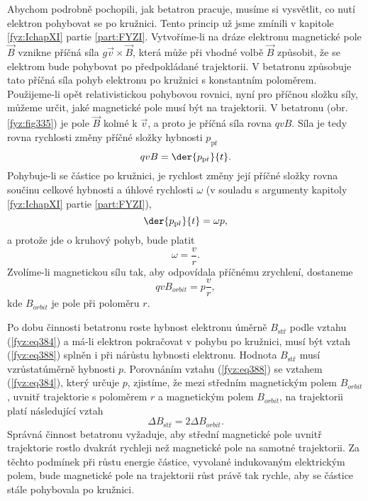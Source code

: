   Abychom podrobně pochopili, jak betatron pracuje, musíme si vysvětlit, co nutí elektron 
  pohybovat se po kružnici. Tento princip už jsme zmínili v kapitole \ref{fyz:IchapXI} partie 
  \ref{part:FYZI}. Vytvoříme-li na dráze elektronu magnetické pole \(\vec{B}\) vznikne příčná síla 
  \(g\vec{v}\times\vec{B}\), která může při vhodné volbě \(\vec{B}\) způsobit, že se elektrom bude 
  pohybovat po předpokládané trajektorii. V betatronu způsobuje tato příčná síla pohyb elektronu 
  po kružnici s konstantním poloměrem. Použijeme-li opět relativistickou pohybovou rovnici, nyní 
  pro příčnou složku síly, můžeme určit, jaké magnetické pole musí být na trajektorii. V betatronu 
  (obr. \ref{fyz:fig335}) je pole \(\vec{B}\) kolmé k \(\vec{v}\), a proto je příčná síla 
  rovna \(qvB\). Síla je tedy rovna rychlosti změny příčné složky hybnosti \(p_\text{př}\)
  \begin{equation}\label{fyz:eq385}
    qvB = \der{p_{\text{př}}}{t}.
  \end{equation}
  Pohybuje-li se částice po kružnici, je rychlost změny její příčné složky rovna součinu celkové 
  hybnosti a úhlové rychlosti \(\omega\) (v souladu s argumenty kapitoly \ref{fyz:IchapXI} partie 
  \ref{part:FYZI}),
  \begin{equation}\label{fyz:eq386}
    \der{p_{\text{př}}}{t} = \omega p, 
  \end{equation}
  a protože jde o kruhový pohyb, bude platit
  \begin{equation}\label{fyz:eq387}
    \omega = \frac{v}{r}. 
  \end{equation}
  Zvolíme-li magnetickou sílu tak, aby odpovídala příčnému zrychlení, dostaneme
  \begin{equation}\label{fyz:eq388}
    qvB_{orbit} = p\frac{v}{r},
  \end{equation}
  kde \(B_{orbit}\) je pole při poloměru \(r\). 
  
  Po dobu činnosti betatronu roste hybnost elektronu úměrně \(B_{\text{stř}}\) podle vztahu 
  (\ref{fyz:eq384}) a má-li elektron pokračovat v pohybu po kružnici, musí být vztah 
  (\ref{fyz:eq388}) splněn i při nárůstu hybnosti elektronu. Hodnota \(B_{\text{stř}}\) musí 
  vzrůstatúměrně hybnosti \(p\). Porovnáním vztahu (\ref{fyz:eq388}) se vztahem (\ref{fyz:eq384}), 
  který určuje \(p\), zjistíme, že mezi středním magnetickým polem \(B_{orbit}\), uvnitř 
  trajektorie s poloměrem \(r\) a magnetickým polem \(B_{orbit}\), na trajektorii platí následující 
  vztah
  \begin{equation}\label{fyz:eq389}
    \Delta B_{\text{stř}} = 2\Delta B_{orbit}.
  \end{equation}
  Správná činnost betatronu vyžaduje, aby střední magnetické pole uvnitř trajektorie rostlo dvakrát 
  rychleji než magnetické pole na samotné trajektorii. Za těchto podmínek při růstu energie 
  částice, vyvolané indukovaným elektrickým polem, bude magnetické pole na trajektorii růst právě 
  tak rychle, aby se částice stále pohybovala po kružnici. 
  

